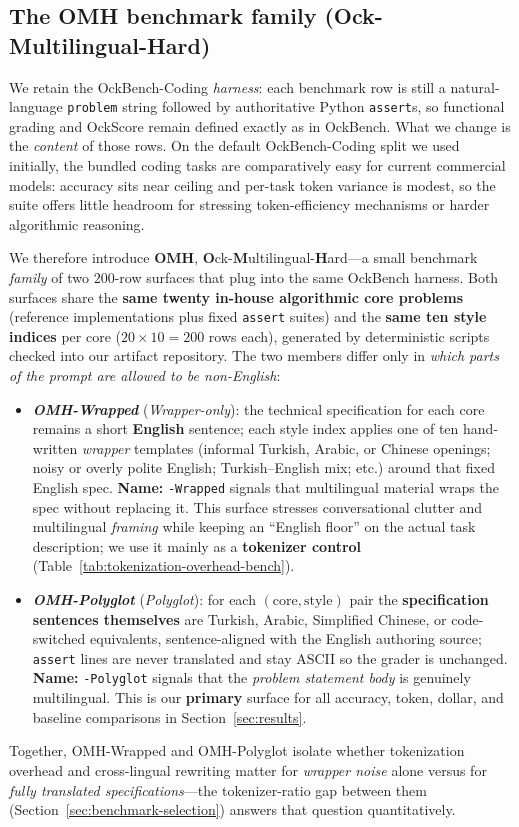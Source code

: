 \documentclass[11pt,a4paper,twocolumn]{article}
\begin{document}
\subsection{The OMH benchmark family (Ock-Multilingual-Hard)}
\label{sec:omh-family}
We retain the OckBench-Coding \cite{du2026ockbench} \emph{harness}: each benchmark row is still a natural-language \texttt{problem} string followed by authoritative Python \texttt{assert}s, so functional grading and OckScore remain defined exactly as in OckBench. What we change is the \emph{content} of those rows. On the default OckBench-Coding split we used initially, the bundled coding tasks are comparatively easy for current commercial models: accuracy sits near ceiling and per-task token variance is modest, so the suite offers little headroom for stressing token-efficiency mechanisms or harder algorithmic reasoning.

We therefore introduce \textbf{OMH}, \textbf{O}ck-\textbf{M}ultilingual-\textbf{H}ard---a small benchmark \emph{family} of two $200$-row surfaces that plug into the same OckBench harness. Both surfaces share the \textbf{same twenty in-house algorithmic core problems} (reference implementations plus fixed \texttt{assert} suites) and the \textbf{same ten style indices} per core ($20\times 10=200$ rows each), generated by deterministic scripts checked into our artifact repository. The two members differ only in \emph{which parts of the prompt are allowed to be non-English}:
\begin{itemize}
    \item \textbf{\textit{OMH-Wrapped}} (\textit{Wrapper-only}): the technical specification for each core remains a short \textbf{English} sentence; each style index applies one of ten hand-written \emph{wrapper} templates (informal Turkish, Arabic, or Chinese openings; noisy or overly polite English; Turkish--English mix; etc.) around that fixed English spec. \textbf{Name:} \texttt{-Wrapped} signals that multilingual material wraps the spec without replacing it. This surface stresses conversational clutter and multilingual \emph{framing} while keeping an ``English floor'' on the actual task description; we use it mainly as a \textbf{tokenizer control} (Table~\ref{tab:tokenization-overhead-bench}).
    \item \textbf{\textit{OMH-Polyglot}} (\textit{Polyglot}): for each $(\text{core},\text{style})$ pair the \textbf{specification sentences themselves} are Turkish, Arabic, Simplified Chinese, or code-switched equivalents, sentence-aligned with the English authoring source; \texttt{assert} lines are never translated and stay ASCII so the grader is unchanged. \textbf{Name:} \texttt{-Polyglot} signals that the \emph{problem statement body} is genuinely multilingual. This is our \textbf{primary} surface for all accuracy, token, dollar, and baseline comparisons in Section~\ref{sec:results}.
\end{itemize}
Together, OMH-Wrapped and OMH-Polyglot isolate whether tokenization overhead and cross-lingual rewriting matter for \emph{wrapper noise} alone versus for \emph{fully translated specifications}---the tokenizer-ratio gap between them (Section~\ref{sec:benchmark-selection}) answers that question quantitatively.
\end{document}
